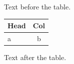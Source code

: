 \documentclass[12pt]{article}
\begin{document}
Text before the table.

\begin{tabular}{lc}\hline\hline Head & Col\\\hline a & b\\\hline\hline\end{tabular}

Text after the table.
\end{document}

